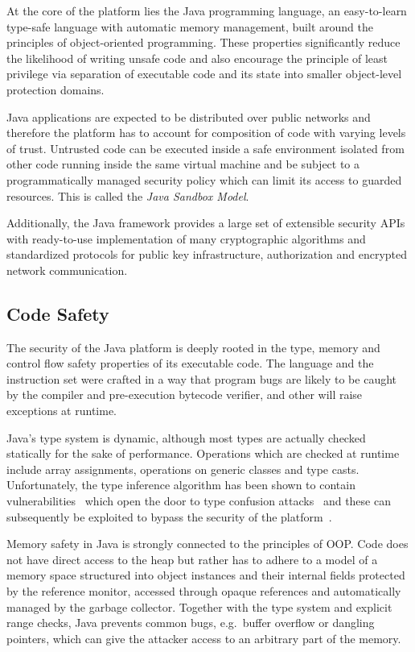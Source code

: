 \documentclass[a4paper,12pt,twoside,openright]{report}
\begin{document}
At the core of the platform lies the Java programming language, an easy-to-learn type-safe language with automatic memory management, built around the principles of object-oriented programming. These properties significantly reduce the likelihood of writing unsafe code and also encourage the principle of least privilege via separation of executable code and its state into smaller object-level protection domains.

Java applications are expected to be distributed over public networks and therefore the platform has to account for composition of code with varying levels of trust. Untrusted code can be executed inside a safe environment isolated from other code running inside the same virtual machine and be subject to a programmatically managed security policy which can limit its access to guarded resources. This is called the \emph{Java Sandbox Model}.

Additionally, the Java framework provides a large set of extensible security APIs with ready-to-use implementation of many cryptographic algorithms and standardized protocols for public key infrastructure, authorization and encrypted network communication. 

\subsection{Code Safety}

The security of the Java platform is deeply rooted in the type, memory and control flow safety properties of its executable code. The language and the instruction set were crafted in a way that program bugs are likely to be caught by the compiler and pre-execution bytecode verifier, and other will raise exceptions at runtime. 

\label{section:TypeConfusion}
Java's type system is dynamic, although most types are actually checked statically for the sake of performance. Operations which are checked at runtime include array assignments, operations on generic classes and type casts. Unfortunately, the type inference algorithm has been shown to contain vulnerabilities~\cite{Suenaga:2012:JavaVulnerability} which open the door to type confusion attacks~\cite{Oh:2012:JavaExploitReport} and these can subsequently be exploited to bypass the security of the platform~\cite{McGraw:1999:SJG:298616}.

Memory safety in Java is strongly connected to the principles of OOP. Code does not have direct access to the heap but rather has to adhere to a model of a memory space structured into object instances and their internal fields protected by the reference monitor, accessed through opaque references and automatically managed by the garbage collector. Together with the type system and explicit range checks, Java prevents common bugs, e.g.\ buffer overflow or dangling pointers, which can give the attacker access to an arbitrary part of the memory.
\end{document}
